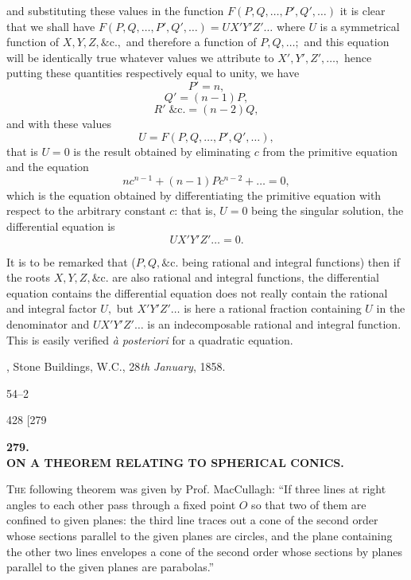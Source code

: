 \documentclass[11pt]{article}
\begin{document}
and substituting these values in the function $F(P,Q,\dots,P',Q',\dots)$ it is clear that we
shall have $F(P,Q,\dots,P',Q',\dots)=UX'Y'Z'\dots$ where $U$ is a symmetrical function of
$X,Y,Z,\&\mathrm{c}.,$ and therefore a function of $P,Q,\dots;$ and this equation will be identically
true whatever values we attribute to $X',Y',Z',\dots,$ hence putting these quantities
respectively equal to unity, we have
\[ P'=n, \]
\[ Q'=(n-1)P, \]
\[ R'\;\&\mathrm{c}.=(n-2)Q, \]
and with these values
\[ U=F(P,Q,\dots,P',Q',\dots), \]
that is $U=0$ is the result obtained by eliminating $c$ from the primitive equation and
the equation
\[ nc^{n-1}+(n-1)Pc^{n-2}+\dots=0, \]
which is the equation obtained by differentiating the primitive equation with respect
to the arbitrary constant $c$: that is, $U=0$ being the singular solution, the differential
equation is
\[ UX'Y'Z'\dots=0. \]

It is to be remarked that ($P,Q,\&\mathrm{c}.$ being rational and integral functions) then
if the roots $X,Y,Z,\&\mathrm{c}.$ are also rational and integral functions, the differential
equation contains the differential equation does not really contain the rational and integral
factor $U,$ but $X'Y'Z'\dots$ is here a rational fraction containing $U$ in the denominator
and $UX'Y'Z'\dots$ is an indecomposable rational and integral function. This is easily
verified \textit{\`a posteriori} for a quadratic equation.

\medskip
{}, Stone Buildings, W.C., 28\textit{th January}, 1858.

\hfill 54--2

\begin{center}
428 \hfill \hfill \textsc{[279}
\end{center}

\begin{center}
\textbf{\large 279.}\\[0.6em]
\textbf{ON A THEOREM RELATING TO SPHERICAL CONICS.}
\end{center}

\medskip
{}
\medskip

\textsc{The} following theorem was given by Prof. MacCullagh: ``If three lines at right
angles to each other pass through a fixed point $O$ so that two of them are confined
to given planes: the third line traces out a cone of the second order whose sections
parallel to the given planes are circles, and the plane containing the other two lines
envelopes a cone of the second order whose sections by planes parallel to the given
planes are parabolas.''
\end{document}
